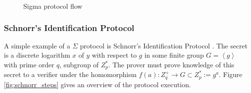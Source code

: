 \begin{figure}[h]
  \centering
  \caption{Sigma protocol flow}
  \label{fig:sigma_flow}
\end{figure}

\subsubsection{Schnorr's Identification Protocol}
\label{subsubsec:schnorr_protocol}

A simple example of a $\Sigma$ protocol is Schnorr's Identification
Protocol \cite{schnorr_protocol, cryptography_introduction}. The
secret is a discrete logarithm $x$ of $y$ with respect to $g$ in some
finite group $G = \left< g \right>$ with prime order $q$, subgroup of
$Z_p^*$. The prover must prove knowledge of this secret to a verifier
under the homomorphism $f(a) : Z_q^+ \rightarrow G \subset Z_p^* :=
g^a$. Figure \ref{fig:schnorr_steps} gives an overview of the protocol
execution.

